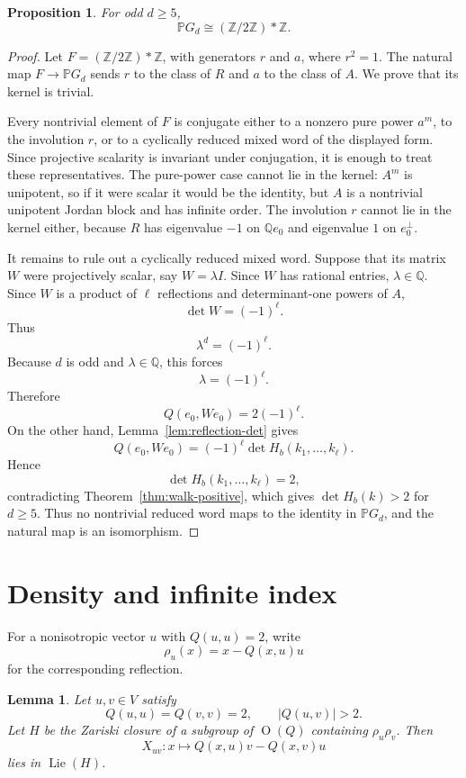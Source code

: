 \documentclass[a4paper,11pt]{amsart}
\newtheorem{proposition}[theorem]{Proposition}
\newtheorem{lemma}[theorem]{Lemma}
\theoremstyle{remark}
\newcommand{\Z}{\mathbb Z}
\newcommand{\Q}{\mathbb Q}
\newcommand{\PP}{\mathbb P}
\DeclareMathOperator{\Ogrp}{O}
\DeclareMathOperator{\Lie}{Lie}
\numberwithin{equation}{section}
\begin{document}
\begin{proposition}\label{prop:free-product}
For odd \(d\ge5\),
\[
        \PP G_d\cong(\Z/2\Z)*\Z.
\]
\end{proposition}

\begin{proof}
Let \(F=(\Z/2\Z)*\Z\), with generators \(r\) and \(a\), where \(r^2=1\).  The natural map \(F\to\PP G_d\) sends \(r\) to the class of \(R\) and \(a\) to the class of \(A\).  We prove that its kernel is trivial.

Every nontrivial element of \(F\) is conjugate either to a nonzero pure power \(a^m\), to the involution \(r\), or to a cyclically reduced mixed word of the displayed form.  Since projective scalarity is invariant under conjugation, it is enough to treat these representatives.  The pure-power case cannot lie in the kernel: \(A^m\) is unipotent, so if it were scalar it would be the identity, but \(A\) is a nontrivial unipotent Jordan block and has infinite order.  The involution \(r\) cannot lie in the kernel either, because \(R\) has eigenvalue \(-1\) on \(\Q e_0\) and eigenvalue \(1\) on \(e_0^\perp\).

It remains to rule out a cyclically reduced mixed word.  Suppose that its matrix \(W\) were projectively scalar, say \(W=\lambda I\).  Since \(W\) has rational entries, \(\lambda\in\Q\).  Since \(W\) is a product of \(\ell\) reflections and determinant-one powers of \(A\),
\[
        \det W=(-1)^\ell.
\]
Thus
\[
        \lambda^d=(-1)^\ell.
\]
Because \(d\) is odd and \(\lambda\in\Q\), this forces
\[
        \lambda=(-1)^\ell.
\]
Therefore
\[
        Q(e_0,We_0)=2(-1)^\ell.
\]
On the other hand, Lemma~\ref{lem:reflection-det} gives
\[
        Q(e_0,We_0)=(-1)^\ell\det H_b(k_1,\ldots,k_\ell).
\]
Hence
\[
        \det H_b(k_1,\ldots,k_\ell)=2,
\]
contradicting Theorem~\ref{thm:walk-positive}, which gives \(\det H_b(k)>2\) for \(d\ge5\).  Thus no nontrivial reduced word maps to the identity in \(\PP G_d\), and the natural map is an isomorphism.
\end{proof}

\section{Density and infinite index}

For a nonisotropic vector \(u\) with \(Q(u,u)=2\), write
\[
        \rho_u(x)=x-Q(x,u)u
\]
for the corresponding reflection.

\begin{lemma}\label{lem:two-reflection-torus}
Let \(u,v\in V\) satisfy
\[
        Q(u,u)=Q(v,v)=2,
        \qquad
        |Q(u,v)|>2.
\]
Let \(H\) be the Zariski closure of a subgroup of \(\Ogrp(Q)\) containing \(\rho_u\rho_v\).  Then
\[
        X_{uv}:x\longmapsto Q(x,u)v-Q(x,v)u
\]
lies in \(\Lie(H)\).
\end{lemma}
\end{document}
